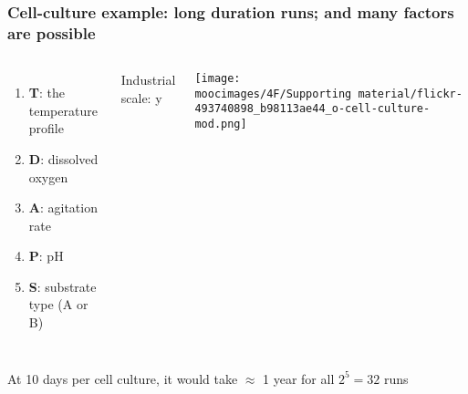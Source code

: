 \documentclass[handout,11pt,aspectratio=169,mathserif]{beamer}
\begin{document}
\begin{frame}\frametitle{Cell-culture example: long duration runs; and many factors are possible}
	\newcommand{\white}{\color{white}}
	\begin{columns}[c]
			\begin{enumerate}
				\item	\textbf{T}: the temperature profile
				\item	\textbf{D}: dissolved oxygen
				\item	\textbf{A}: agitation rate
				\item	\textbf{P}: pH
				\item	\textbf{S}: substrate type (A or B)
			\end{enumerate}
		
			{\color{blue} \small Industrial scale: {\color{white}y}}   
			
			\vspace{0.2cm}
			
			\centerline{\texttt{[image: \\moocimages/4F/Supporting material/flickr-493740898\_b98113ae44\_o-cell-culture-mod.png]}}
	\end{columns}

	\vfill
	At 10 days per cell culture, it would take $\approx$ 1 year for all $2^5 = 32$ runs
	
\end{frame}
\end{document}
